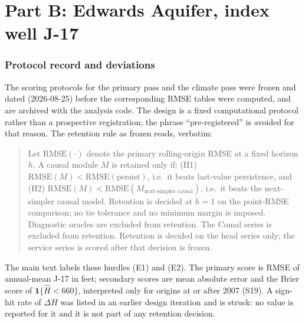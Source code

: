 \FloatBarrier
\part*{Part B: Edwards Aquifer, index well J-17}

\section{Protocol record and deviations}\label{si:edwprotocol}

The scoring protocols for the primary pass and the climate pass were frozen and dated (2026-08-25) before the corresponding RMSE tables were computed, and are archived with the analysis code. The design is a fixed computational protocol rather than a prospective registration; the phrase ``pre-registered'' is avoided for that reason. The retention rule as frozen reads, verbatim:

\begin{quote}\small
Let $\mathrm{RMSE}(\cdot)$ denote the primary rolling-origin RMSE at a fixed horizon $h$. A causal module $M$ is retained only if: (H1) $\mathrm{RMSE}(M) < \mathrm{RMSE}(\text{persist})$, i.e.\ it beats last-value persistence, and (H2) $\mathrm{RMSE}(M) < \mathrm{RMSE}(M_{\text{next-simpler causal}})$, i.e.\ it beats the next-simpler causal model. Retention is decided at $h=1$ on the point-RMSE comparison; no tie tolerance and no minimum margin is imposed. Diagnostic oracles are excluded from retention. The Comal series is excluded from retention. Retention is decided on the head series only; the service series is scored after that decision is frozen.
\end{quote}

The main text labels these hurdles (E1) and (E2). The primary score is RMSE of annual-mean J-17 in feet; secondary scores are mean absolute error and the Brier score of $\mathbf{1}\{\hat H<660\}$, interpreted only for origins at or after 2007 (S19). A sign-hit rate of $\Delta H$ was listed in an earlier design iteration and is struck: no value is reported for it and it is not part of any retention decision.

